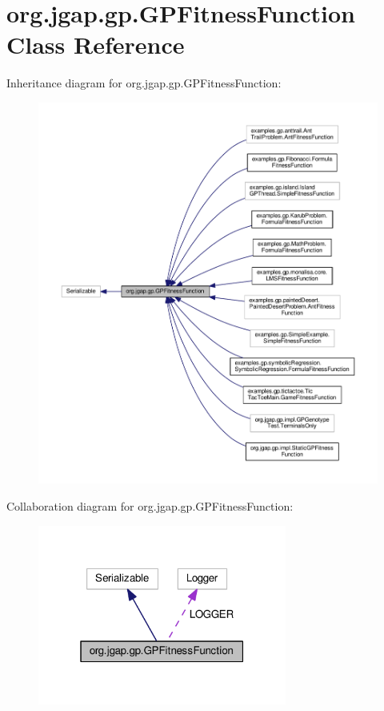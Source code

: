 \hypertarget{classorg_1_1jgap_1_1gp_1_1_g_p_fitness_function}{\section{org.\-jgap.\-gp.\-G\-P\-Fitness\-Function Class Reference}
\label{classorg_1_1jgap_1_1gp_1_1_g_p_fitness_function}
}


Inheritance diagram for org.\-jgap.\-gp.\-G\-P\-Fitness\-Function\-:
\nopagebreak
\begin{figure}[H]
\begin{center}
\leavevmode
\includegraphics[width=350pt]{classorg_1_1jgap_1_1gp_1_1_g_p_fitness_function__inherit__graph}
\end{center}
\end{figure}


Collaboration diagram for org.\-jgap.\-gp.\-G\-P\-Fitness\-Function\-:
\nopagebreak
\begin{figure}[H]
\begin{center}
\leavevmode
\includegraphics[width=232pt]{classorg_1_1jgap_1_1gp_1_1_g_p_fitness_function__coll__graph}
\end{center}
\end{figure}
